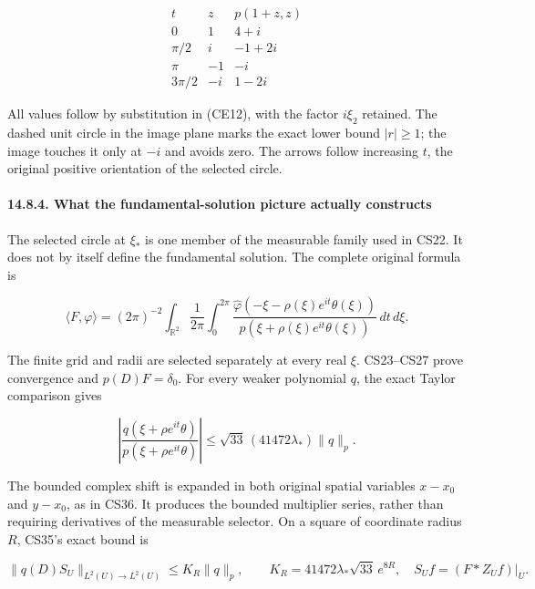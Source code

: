 \documentclass[
  11pt,
]{article}
\makeatletter
\let\ReaderOriginalAnchorStart\hyper@anchorstart
\let\ReaderOriginalAnchorEnd\hyper@anchorend
\let\ReaderPendingAliases\@empty
\def\ReaderArmAliases#1{\gdef\ReaderPendingAliases{#1}}
\def\hyper@anchorstart#1{\ReaderIfNativeAnchorTF{#1}{\ReaderPendingAliases\global\let\ReaderPendingAliases\@empty}{}\ReaderOriginalAnchorStart{#1}}
\makeatother
\begin{document}
\[
\begin{array}{c|c|c}
t & z & p(1+z,z)\\\hline
0 & 1 & 4+i\\
\pi/2 & i & -1+2i\\
\pi & -1 & -i\\
3\pi/2 & -i & 1-2i
\end{array}                                                   \tag{CE21}
\]

All values follow by substitution in (CE12), with the factor \(i\xi_2\)
retained. The dashed unit circle in the image plane marks the exact
lower bound \(|r|\geq1\); the image touches it only at \(-i\) and avoids
zero. The arrows follow increasing \(t\), the original positive
orientation of the selected circle.

\ReaderArmAliases{\ReaderOriginalAnchorStart{what-the-fundamental-solution-picture-actually-constructs}\ReaderOriginalAnchorEnd}
\paragraph{14.8.4. What the fundamental-solution picture actually
constructs}\label{what-the-fundamental-solution-picture-actually-constructs}

The selected circle at \(\xi_*\) is one member of the measurable family
used in CS22. It does not by itself define the fundamental solution. The
complete original formula is

\[
 \langle F,\varphi\rangle
 =(2\pi)^{-2}\int_{\mathbb R^2}\frac1{2\pi}\int_0^{2\pi}
 \frac{\widehat\varphi(-\xi-\rho(\xi)e^{it}\theta(\xi))}
 {p(\xi+\rho(\xi)e^{it}\theta(\xi))}\,dt\,d\xi.               \tag{CE22}
\]

The finite grid and radii are selected separately at every real \(\xi\).
CS23--CS27 prove convergence and \(p(D)F=\delta_0\). For every weaker
polynomial \(q\), the exact Taylor comparison gives

\[
 \left|\frac{q(\xi+\rho e^{it}\theta)}
              {p(\xi+\rho e^{it}\theta)}\right|
       \leq\sqrt{33}\,(41472\lambda_*)\|q\|_p.               \tag{CE23}
\]

The bounded complex shift is expanded in both original spatial variables
\(x-x_0\) and \(y-x_0\), as in CS36. It produces the bounded multiplier
series, rather than requiring derivatives of the measurable selector. On
a square of coordinate radius \(R\), CS35's exact bound is

\[
 \|q(D)S_U\|_{L^2(U)\to L^2(U)}
 \leq K_R\|q\|_p,\qquad
 K_R=41472\lambda_*\sqrt{33}\,e^{8R},
 \quad S_Uf=(F*Z_Uf)|_U.                                    \tag{CE24}
\]
\end{document}
